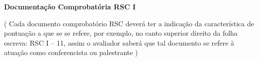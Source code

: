 \label{documentacao-probatoria-rsc-i}

\begin{center}
	\begin{LARGE}
		\textbf{Documentação Comprobatória RSC I}
	\end{LARGE}
\end{center}

\ifcomentarios
\begin{center}
	{\color{red}
		( Cada documento comprobatório RSC deverá ter a indicação da característica de pontuação a que se se refere, por exemplo, no canto superior direito da folha escreva: RSC I – 11, assim o avaliador saberá que tal documento se refere à atuação como conferencista ou palestrante )
	}
\end{center}
\fi